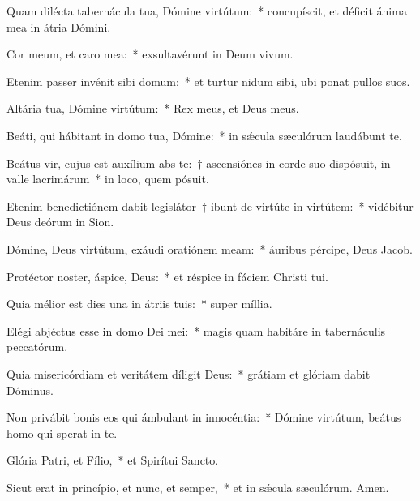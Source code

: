 \item Quam dilécta tabernácula tua, Dómine virtútum:~* concupíscit, et déficit ánima mea in átria Dómini.

\item Cor meum, et caro mea:~* exsultavérunt in Deum vivum.

\item Etenim passer invénit sibi domum:~* et turtur nidum sibi, ubi ponat pullos suos.

\item Altária tua, Dómine virtútum:~* Rex meus, et Deus meus.

\item Beáti, qui hábitant in domo tua, Dómine:~* in sǽcula sæculórum laudábunt te.

\item Beátus vir, cujus est auxílium abs te:~† ascensiónes in corde suo dispósuit, in valle lacrimárum~* in loco, quem pósuit.

\item Etenim benedictiónem dabit legislátor~† ibunt de virtúte in virtútem:~* vidébitur Deus deórum in Sion.

\item Dómine, Deus virtútum, exáudi oratiónem meam:~* áuribus pércipe, Deus Jacob.

\item Protéctor noster, áspice, Deus:~* et réspice in fáciem Christi tui.

\item Quia mélior est dies una in átriis tuis:~* super míllia.

\item Elégi abjéctus esse in domo Dei mei:~* magis quam habitáre in tabernáculis peccatórum.

\item Quia misericórdiam et veritátem díligit Deus:~* grátiam et glóriam dabit Dóminus.

\item Non privábit bonis eos qui ámbulant in innocéntia:~* Dómine virtútum, beátus homo qui sperat in te.

\item Glória Patri, et Fílio,~* et Spirítui Sancto.

\item Sicut erat in princípio, et nunc, et semper,~* et in sǽcula sæculórum. Amen.

